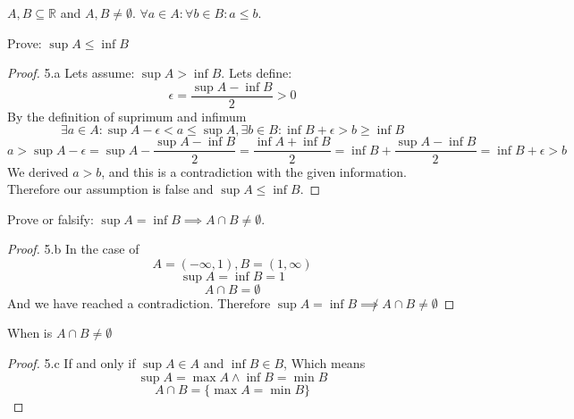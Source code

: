 \documentclass[12pt]{article}
\newenvironment{problem}[2][Problem]{\begin{trivlist}
\item[\hskip \labelsep {\bfseries #1}\hskip \labelsep {\bfseries #2.}]}{\end{trivlist}}
\begin{document}
\begin{problem}{5}
	$A, B \subseteq \mathbb{R}$ and $A,B \ne \emptyset$. $\forall a \in A : \forall b \in B: a \le b$.

\begin{problem}{5.a}
	Prove: $\sup A \le \inf B$
\end{problem}

\begin{proof}{5.a}
	Lets assume: $\sup A > \inf B$.
	Lets define: $$\epsilon = \frac{\sup A - \inf B}{2} > 0$$
	By the definition of suprimum and infimum $$\exists a \in A: \sup A - \epsilon < a \le \sup A, \exists b \in B: \inf B + \epsilon > b \ge \inf B$$
	$$a > \sup A - \epsilon = \sup A - \frac{\sup A - \inf B}{2} = \frac{\inf A + \inf B}{2} = \inf B + \frac{\sup A - \inf B}{2} = \inf B + \epsilon > b$$
	We derived $a > b$, and this is a contradiction with the given information. Therefore our assumption is false and $\sup A \le \inf B$.
\end{proof}

\begin{problem}{5.b}
	Prove or falsify: $\sup A = \inf B \implies A \cap B \ne \emptyset$.
\end{problem}

\begin{proof}{5.b}
	In the case of 
	$$A = (-\infty, 1), B = (1, \infty)$$
	$$\sup A = \inf B = 1$$
	$$A \cap B = \emptyset$$
	And we have reached a contradiction. Therefore $\sup A = \inf B \not\implies A \cap B \ne \emptyset$
\end{proof}

\begin{problem}{5.c}
	When is $A \cap B \ne \emptyset$
\end{problem}

\begin{proof}{5.c}
	If and only if $\sup A \in A$ and $\inf B \in B$, Which means $$\sup A = \max A \land \inf B = \min B$$ $$A \cap B = \{\max A = \min B\}$$
\end{proof}

\end{problem}
\end{document}
